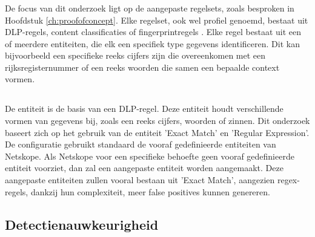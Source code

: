 \subsubsection{}
\label{subsubsec:aangepaste-regels-literatuurstudie}

De focus van dit onderzoek ligt op de aangepaste regelsets, zoals besproken in Hoofdstuk \ref{ch:proofofconcept}. 
Elke regelset, ook wel profiel genoemd, bestaat uit DLP-regels, content classificaties of fingerprintregels \autocite{Netskope2025CreateProfiles}.
Elke regel bestaat uit een of meerdere entiteiten, die elk een specifiek type gegevens identificeren. 
Dit kan bijvoorbeeld een specifieke reeks cijfers zijn die overeenkomen met een rijksregisternummer of een reeks woorden die samen een bepaalde context vormen. 

\subsection{}
\label{subsec:entiteit-literatuurstudie}

De entiteit is de basis van een DLP-regel. 
Deze entiteit houdt verschillende vormen van gegevens bij, zoals een reeks cijfers, woorden of zinnen. 
Dit onderzoek baseert zich op het gebruik van de entiteit 'Exact Match' en 'Regular Expression'. 
De configuratie gebruikt standaard de vooraf gedefinieerde entiteiten van Netskope. 
Als Netskope voor een specifieke behoefte geen vooraf gedefinieerde entiteit voorziet, dan zal een aangepaste entiteit worden aangemaakt.
Deze aangepaste entiteiten zullen vooral bestaan uit 'Exact Match', aangezien regex-regels, dankzij hun complexiteit, meer false positives kunnen genereren.


\subsection{Detectienauwkeurigheid}
\label{sec:detectienauwkeurigheid-literatuurstudie}

